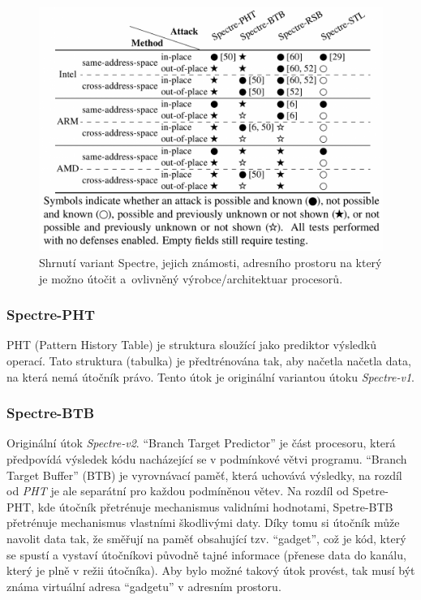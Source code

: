 \begin{figure}[htbp]
    \includegraphics[width=.8\textwidth]{img/spectre-1.png}
    \centering
    \caption{Shrnutí variant Spectre, jejich známosti, adresního prostoru na který je možno útočit a~ovlivněný výrobce/architektuar procesorů.}
    \label{img:spectre}
\end{figure}

\subsubsection{Spectre-PHT}

PHT (Pattern History Table) je struktura sloužící jako prediktor výsledků operací.
Tato struktura (tabulka) je předtrénována tak, aby načetla načetla data, na která nemá útočník právo.
Tento útok je originální variantou útoku \textit{Spectre-v1}.

\subsubsection{Spectre-BTB}

Originální útok \textit{Spectre-v2}.
\enquote{Branch Target Predictor} je část procesoru, která předpovídá výsledek kódu nacházející se v podmínkové větvi programu.
\enquote{Branch Target Buffer} (BTB) je vyrovnávací paměť, která uchovává výsledky, na rozdíl od \textit{PHT} je ale separátní pro každou podmíněnou větev.
Na rozdíl od Spetre-PHT, kde útočník přetrénuje mechanismus validními hodnotami, Spetre-BTB přetrénuje mechanismus vlastními škodlivými daty.
Díky tomu si útočník může navolit data tak, že směřují na paměť obsahující tzv. \enquote{gadget}, což je kód, který se spustí a vystaví útočníkovi původně tajné informace (přenese data do kanálu, který je plně v režii útočníka).
Aby bylo možné takový útok provést, tak musí být známa virtuální adresa \enquote{gadgetu} v adresním prostoru.

